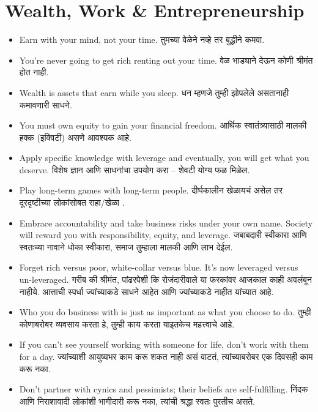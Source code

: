 \section*{Wealth, Work \& Entrepreneurship}
\begin{itemize}
  \item Earn with your mind, not your time. तुमच्या वेळेने नव्हे तर बुद्धीने कमवा.

  \item You’re never going to get rich renting out your time. वेळ भाड्याने देऊन कोणी श्रीमंत होत नाही.

  \item Wealth is assets that earn while you sleep. धन म्हणजे तुम्ही झोपलेले असतानाही कमावणारी साधने.

  \item You must own equity to gain your financial freedom. आर्थिक स्वातंत्र्यासाठी मालकी हक्क (इक्विटी) असणे आवश्यक आहे.

  \item Apply specific knowledge with leverage and eventually, you will get what you deserve. विशेष ज्ञान आणि साधनांचा उपयोग करा – शेवटी योग्य फळ मिळेल.

  \item Play long-term games with long-term people. दीर्घकालीन खेळायचं असेल तर दूरदृष्टीच्या लोकांसोबत राहा/खेळा .

  \item Embrace accountability and take business risks under your own name. Society will reward you with responsibility, equity, and leverage. जबाबदारी स्वीकारा आणि स्वतःच्या नावाने धोका स्वीकारा, समाज तुम्हाला मालकी आणि लाभ देईल.

  \item Forget rich versus poor, white-collar versus blue. It’s now leveraged versus un-leveraged. 
गरीब की श्रीमंत, पांढरपेशी कि रोजंदारीवाले या फरकांवर आजकाल काही अवलंबून नाहीये. आत्ताची स्पर्धा  ज्यांच्याकडे साधने आहेत आणि ज्यांच्याकडे नाहीत यांच्यात आहे.

  \item Who you do business with is just as important as what you choose to do. तुम्ही कोणाबरोबर व्यवसाय करता हे, तुम्ही काय करता याइतकेच महत्त्वाचे आहे.

  \item If you can’t see yourself working with someone for life, don’t work with them for a day. ज्यांच्याशी आयुष्यभर काम करू शकत नाही असं वाटतं, त्यांच्याबरोबर एक दिवसही काम करू नका.

  \item Don’t partner with cynics and pessimists; their beliefs are self-fulfilling. निंदक आणि निराशावादी लोकांशी भागीदारी करू नका, त्यांची श्रद्धा स्वतः पुरतीच असते.


\end{itemize}
